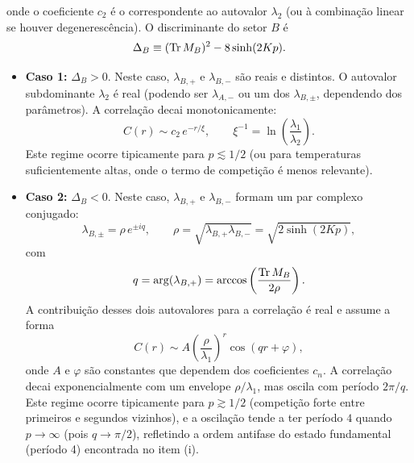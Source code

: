 \documentclass[11pt,a4paper]{article}
\begin{document}
%
onde o coeficiente \(c_2\) é o correspondente ao autovalor \(\lambda_2\) (ou à combinação linear se houver degenerescência).
%
O discriminante do setor \(B\) é
%
\begin{equation}
    \Delta_B \equiv (\Tr M_B)^2 - 8\sinh(2Kp).
\end{equation}
%
\begin{itemize}
    \item \textbf{Caso 1:} \(\Delta_B > 0\). Neste caso, \(\lambda_{B,+}\) e \(\lambda_{B,-}\) são reais e distintos. O autovalor subdominante \(\lambda_2\) é real (podendo ser \(\lambda_{A,-}\) ou um dos \(\lambda_{B,\pm}\), dependendo dos parâmetros). A correlação decai monotonicamente:
    \begin{equation}
        C(r) \sim c_2 \, e^{-r/\xi},
        \qquad
        \xi^{-1} = \ln\left( \frac{\lambda_1}{\lambda_2} \right).
        \label{eq:xi_monot}
    \end{equation}
    Este regime ocorre tipicamente para \(p \lesssim 1/2\) (ou para temperaturas suficientemente altas, onde o termo de competição é menos relevante).
    \item \textbf{Caso 2:} \(\Delta_B < 0\). Neste caso, \(\lambda_{B,+}\) e \(\lambda_{B,-}\) formam um par complexo conjugado:
    \begin{equation}
        \lambda_{B,\pm} = \rho \, e^{\pm i q},
        \qquad
        \rho = \sqrt{\lambda_{B,+} \lambda_{B,-}} = \sqrt{2\sinh(2Kp)},
    \end{equation}
    com
    \begin{equation}
        q = \arg(\lambda_{B,+}) = \arccos\left( \frac{\Tr M_B}{2\rho} \right).
    \end{equation}
    A contribuição desses dois autovalores para a correlação é real e assume a forma
    \begin{equation}
        C(r) \sim A \left( \frac{\rho}{\lambda_1} \right)^r \cos(q r + \varphi),
        \label{eq:corr_osc}
    \end{equation}
    onde \(A\) e \(\varphi\) são constantes que dependem dos coeficientes \(c_n\). A correlação decai exponencialmente com um envelope \(\rho/\lambda_1\), mas oscila com período \(2\pi/q\). Este regime ocorre tipicamente para \(p \gtrsim 1/2\) (competição forte entre primeiros e segundos vizinhos), e a oscilação tende a ter período \(4\) quando \(p \to \infty\) (pois \(q \to \pi/2\)), refletindo a ordem antifase do estado fundamental (período 4) encontrada no item (i).
\end{itemize}
\end{document}
